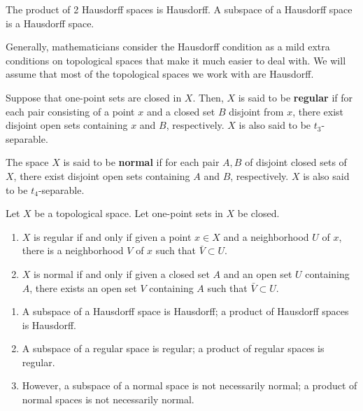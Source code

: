     \begin{theorem}
      The product of 2 Hausdorff spaces is Hausdorff. A subspace of a Hausdorff space is a Hausdorff space. 
    \end{theorem}

    Generally, mathematicians consider the Hausdorff condition as a mild extra conditions on topological spaces that make it much easier to deal with. We will assume that most of the topological spaces we work with are Hausdorff. 

    \begin{definition}
      Suppose that one-point sets are closed in $X$. Then, $X$ is said to be \textbf{regular} if for each pair consisting of a point $x$ and a closed set $B$ disjoint from $x$, there exist disjoint open sets containing $x$ and $B$, respectively. $X$ is also said to be $t_3$-separable. 
    \end{definition}

    \begin{definition}
      The space $X$ is said to be \textbf{normal} if for each pair $A, B$ of disjoint closed sets of $X$, there exist disjoint open sets containing $A$ and $B$, respectively. $X$ is also said to be $t_4$-separable. 
    \end{definition}

    \begin{lemma}
      Let $X$ be a topological space. Let one-point sets in $X$ be closed. 
      \begin{enumerate}
        \item $X$ is regular if and only if given a point $x \in X$ and a neighborhood $U$ of $x$, there is a neighborhood $V$ of $x$ such that $\bar{V} \subset U$. 
        \item $X$ is normal if and only if given a closed set $A$ and an open set $U$ containing $A$, there exists an open set $V$ containing $A$ such that $\bar{V} \subset U$. 
      \end{enumerate}
    \end{lemma}

    \begin{theorem}
      \begin{enumerate}
        \item A subspace of a Hausdorff space is Hausdorff; a product of Hausdorff spaces is Hausdorff. 
        \item A subspace of a regular space is regular; a product of regular spaces is regular. 
        \item However, a subspace of a normal space is not necessarily normal; a product of normal spaces is not necessarily normal. 
      \end{enumerate}
    \end{theorem}

